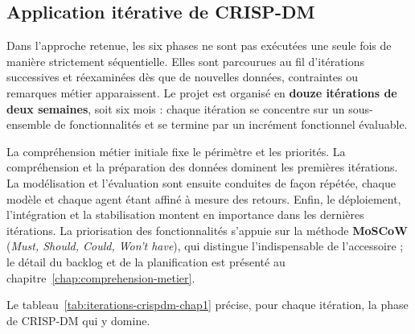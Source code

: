 \subsection{Application itérative de CRISP-DM}

Dans l'approche retenue, les six phases ne sont pas exécutées une seule fois de manière strictement séquentielle. Elles sont parcourues au fil d'itérations successives et réexaminées dès que de nouvelles données, contraintes ou remarques métier apparaissent. Le projet est organisé en \textbf{douze itérations de deux semaines}, soit six mois : chaque itération se concentre sur un sous-ensemble de fonctionnalités et se termine par un incrément fonctionnel évaluable.

La compréhension métier initiale fixe le périmètre et les priorités. La compréhension et la préparation des données dominent les premières itérations. La modélisation et l'évaluation sont ensuite conduites de façon répétée, chaque modèle et chaque agent étant affiné à mesure des retours. Enfin, le déploiement, l'intégration et la stabilisation montent en importance dans les dernières itérations. La priorisation des fonctionnalités s'appuie sur la méthode \textbf{MoSCoW} (\textit{Must, Should, Could, Won't have}), qui distingue l'indispensable de l'accessoire ; le détail du backlog et de la planification est présenté au chapitre~\ref{chap:comprehension-metier}.

Le tableau~\ref{tab:iterations-crispdm-chap1} précise, pour chaque itération, la phase de CRISP-DM qui y domine.

